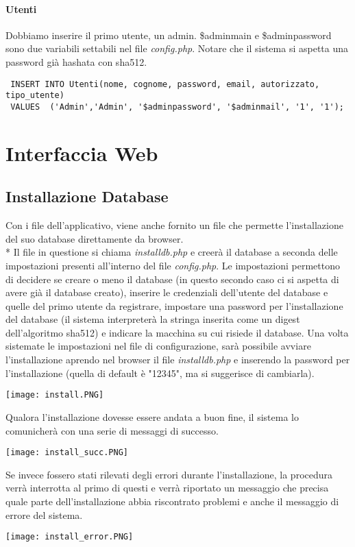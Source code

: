 \documentclass[12pt]{article}
\begin{document}
\paragraph{Utenti} Dobbiamo inserire il primo utente, un admin. \$adminmain e \$adminpassword sono due variabili settabili nel file \textit{config.php}. Notare che il sistema si aspetta una password già hashata con sha512.
\begin{verbatim}
 INSERT INTO Utenti(nome, cognome, password, email, autorizzato, tipo_utente)
 VALUES  ('Admin','Admin', '$adminpassword', '$adminmail', '1', '1');
\end{verbatim}

\newpage
\section{Interfaccia Web}
\subsection{Installazione Database}
Con i file dell'applicativo, viene anche fornito un file che permette l'installazione del suo database direttamente da browser.\\*
Il file in questione si chiama \textit{installdb.php} e creerà il database a seconda delle impostazioni presenti all'interno del file \textit{config.php}. Le impostazioni permettono di decidere se creare o meno il database (in questo secondo caso ci si aspetta di avere già il database creato), inserire le credenziali dell'utente del database e quelle del primo utente da registrare, impostare una password per l'installazione del database (il sistema interpreterà la stringa inserita come un digest dell'algoritmo sha512) e indicare la macchina su cui risiede il database.
Una volta sistemate le impostazioni nel file di configurazione, sarà possibile avviare l'installazione aprendo nel browser il file \textit{installdb.php} e inserendo la password per l'installazione (quella di default è "12345", ma si suggerisce di cambiarla).
\begin{center}
    \texttt{[image: install.PNG]}
\end{center}
Qualora l'installazione dovesse essere andata a buon fine, il sistema lo comunicherà con una serie di messaggi di successo.
\begin{center}
    \texttt{[image: install\_succ.PNG]}
\end{center}
Se invece fossero stati rilevati degli errori durante l'installazione, la procedura verrà interrotta al primo di questi e verrà riportato un messaggio che precisa quale parte dell'installazione abbia riscontrato problemi e anche il messaggio di errore del sistema.
\begin{center}
    \texttt{[image: install\_error.PNG]}
\end{center}
\end{document}
